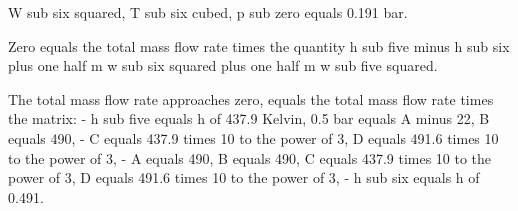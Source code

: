 W sub six squared, T sub six cubed, p sub zero equals 0.191 bar.

Zero equals the total mass flow rate times the quantity h sub five minus h sub six plus one half m w sub six squared plus one half m w sub five squared.

The total mass flow rate approaches zero, equals the total mass flow rate times the matrix:
- h sub five equals h of 437.9 Kelvin, 0.5 bar equals A minus 22, B equals 490,
- C equals 437.9 times 10 to the power of 3, D equals 491.6 times 10 to the power of 3,
- A equals 490, B equals 490, C equals 437.9 times 10 to the power of 3, D equals 491.6 times 10 to the power of 3,
- h sub six equals h of 0.491.
